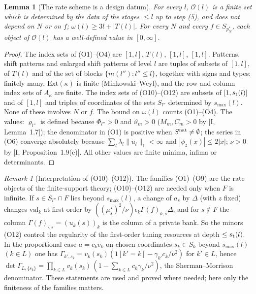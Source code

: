 \documentclass[10pt]{amsart}
\newtheorem{lemma}[theorem]{Lemma}
\theoremstyle{definition}
\theoremstyle{remark}
\newtheorem{remark}[theorem]{Remark}
\begin{document}
\begin{lemma}[The rate scheme is a design datum]\label{lem:II-ratescheme}
For every $l$, $\mathcal O(l)$ is a finite set which is determined by the
data of the stages $\le l$ up to step (5), and does not depend on $N$ or
on $f$; $\omega(l)\ge3l+|T(l)|$.  For every $N$ and every
$f\in S_{p_N^*}$, each object of $\mathcal O(l)$ has a well-defined value in
$[0,\infty]$.
\end{lemma}

\begin{proof}
The index sets of (O1)--(O4) are $[1,l]$, $T(l)$, $[1,l]$, $[1,l]$.
Patterns, shift patterns and enlarged shift patterns of level $l$ are
tuples of subsets of $[1,l]$, of $T(l)$ and of the set of blocks
$\{m(l''):l''\le l\}$, together with signs and types: finitely many.
$\mathrm{Ext}(\kappa)$ is finite (Minkowski--Weyl), and the row and column
index sets of $A_\kappa$ are finite.  The index sets of (O10)--(O12) are
subsets of $[1,s_{\rm t}(l)]$ and of $[1,l]$ and triples of
coordinates of the sets $S_{l''}$ determined by $s_{\max}(l)$.  None of
these involves $N$ or $f$.  The bound on $\omega(l)$ counts (O1)--(O4).
The values: $\varrho_{l''}$ is defined because $\Phi_{l''}>0$ and
$\vartheta_m>0$ ($M_m,C_m>0$ by [I, Lemma~1.7]); the
denominator in (O1) is positive when $S^{\rm nat}\ne\emptyset$; the series
in (O6) converge absolutely because $\sum_l\lambda_l\|u_l\|_1<\infty$ and
$|\phi_z(x)|\le2|x|$; $\nu>0$ by [I, Proposition~1.9(c)].  All
other values are finite minima, infima or determinants.
\end{proof}

\begin{remark}[Interpretation of (O10)--(O12)]\label{rem:II-newrates}
The families (O1)--(O9) are the rate objects of the finite-support
theory; (O10)--(O12) are needed only when $F$ is infinite.  If
$s\in S_{l''}\cap F$ lies beyond $s_{\max}(l)$, a change of $a_s$ by
$\Delta$ (with $z$ fixed) changes $\mathrm{val}_k$ at first order by
$((\mu^\star_s)^2/\nu)\epsilon_k\Gamma(f)_{k,s}\Delta$, and for
$s\notin F$ the column $\Gamma(f)_{\cdot,s}=(u_k(s))_k$ is the column of
a private bank.  So the minors (O12) control the regularity of the
first-order tuning resources at depth $\le s_{\rm t}(l)$.  In the
proportional case $a=c_kv_k$ on chosen coordinates $s_k\in S_k$ beyond
$s_{\max}(l)$ $(k\in L)$ one has $\Gamma_{k',s_k}=v_k(s_k)(1[k'=k]-
\gamma_{k'}c_k/\nu^2)$ for $k'\in L$, hence
$\det\Gamma_{L,\{s_k\}}=\prod_{k\in L}v_k(s_k)\,
(1-\sum_{k\in L}c_k\gamma_k/\nu^2)$, the Sherman--Morrison
denominator.  These statements are used and proved where needed; here
only the finiteness of the families matters.
\end{remark}
\end{document}
